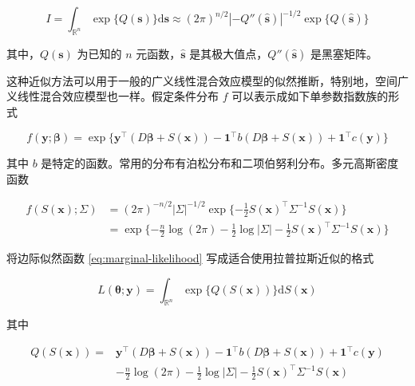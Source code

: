 \documentclass[12pt,a4paper,UTF8,twoside]{book}
\theoremstyle{definition}
\theoremstyle{definition}
\theoremstyle{definition}
\theoremstyle{remark}
\begin{document}
\begin{equation}
I   =  \int_{\mathbb{R}^n} \exp\{Q(\mathbf{s})\}\mathrm{d}\mathbf{s} 
  \approx  (2\pi)^{n/2} |-Q''(\hat{\mathbf{s}})|^{-1/2}\exp\{Q(\hat{\mathbf{s}})\} \label{eq:laplace-approximate}
\end{equation}

其中，\(Q(\mathbf{s})\) 为已知的 \(n\) 元函数，\(\hat{\mathbf{s}}\)
是其极大值点，\(Q''(\hat{\mathbf{s}})\) 是黑塞矩阵。

这种近似方法可以用于一般的广义线性混合效应模型的似然推断，特别地，空间广义线性混合效应模型也一样。假定条件分布
\(f\) 可以表示成如下单参数指数族的形式

\begin{equation}
f(\mathbf{y};\boldsymbol{\beta})  = \exp\{\mathbf{y}^{\top} (D\boldsymbol{\beta} + S(\mathbf{x})) - \mathbf{1}^{\top} b( D\boldsymbol{\beta} + S(\mathbf{x})) + \mathbf{1}^{\top} c(\mathbf{y}) \}  \label{eq:exponential-family}
\end{equation}

其中 \(b\)
是特定的函数。常用的分布有泊松分布和二项伯努利分布。多元高斯密度函数

\begin{align}
f(S(\mathbf{x});\Sigma) & = (2\pi)^{-n/2}|\Sigma|^{-1/2} \exp\{ -\frac{1}{2}S(\mathbf{x})^{\top} \Sigma^{-1} S(\mathbf{x}) \} \\
                      & = \exp\{ - \frac{n}{2}\log (2\pi) -\frac{1}{2}\log |\Sigma|  -\frac{1}{2}S(\mathbf{x})^{\top} \Sigma^{-1} S(\mathbf{x}) \} \label{eq:multi-gaussian-dist}
\end{align}

将边际似然函数 \eqref{eq:marginal-likelihood}
写成适合使用拉普拉斯近似的格式

\begin{equation}
L(\boldsymbol{\theta};\mathbf{y}) = \int_{\mathbb{R}^n} \exp\{Q(S(\mathbf{x}))\} \mathrm{d}S(\mathbf{x}) 
\end{equation}

其中

\begin{equation}
\begin{aligned}
Q(S(\mathbf{x})) ={} &  \mathbf{y}^{\top} (D \boldsymbol{\beta} + S(\mathbf{x})) - \mathbf{1}^{\top} b(D \boldsymbol{\beta} + S(\mathbf{x})) + \mathbf{1}^{\top}c(\mathbf{y}) \\
                   & - \frac{n}{2}\log (2\pi) -\frac{1}{2}\log |\Sigma| -\frac{1}{2}S(\mathbf{x})^{\top} \Sigma^{-1} S(\mathbf{x})
\end{aligned} \label{eq:log-lik}
\end{equation}
\end{document}

